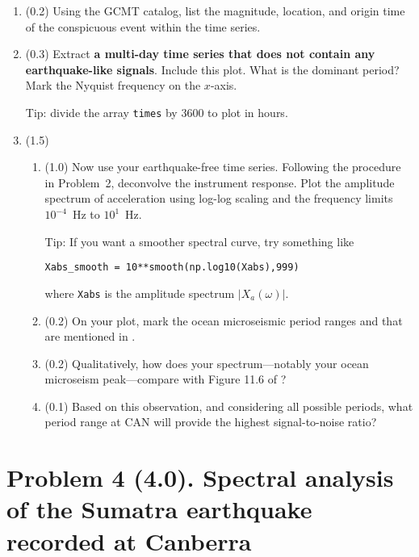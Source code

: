 \documentclass[11pt,titlepage,fleqn]{article}
\begin{document}
\begin{enumerate}
\item (0.2) Using the GCMT catalog, list the magnitude, location, and origin time of the conspicuous event within the time series. 

\item (0.3) Extract {\bf a multi-day time series that does not contain any earthquake-like signals}. Include this plot. What is the dominant period? Mark the Nyquist frequency on the $x$-axis.

Tip: divide the array \verb+times+ by 3600 to plot in hours.

\item (1.5)

\begin{enumerate}
\item (1.0) Now use your earthquake-free time series.
Following the procedure in Problem~2, deconvolve the instrument response.
Plot the amplitude spectrum of acceleration using log-log scaling and the frequency limits $10^{-4}$~Hz to $10^1$~Hz.

Tip: If you want a smoother spectral curve, try something like

\noindent
\verb+Xabs_smooth = 10**smooth(np.log10(Xabs),999)+

\noindent
where \verb+Xabs+ is the amplitude spectrum $|X_a(\omega)|$.

\item (0.2) On your plot, mark the ocean microseismic period ranges  and  that are mentioned in \citet[][Section 11.2]{ShearerE2}.

\item (0.2) Qualitatively, how does your spectrum---notably your ocean microseism peak---compare with Figure 11.6 of \citet{ShearerE2}?

\item (0.1) Based on this observation, and considering all possible periods, what period range at CAN will provide the highest signal-to-noise ratio?

\end{enumerate}

\end{enumerate}


\section*{Problem 4 (4.0). Spectral analysis of the Sumatra earthquake recorded at Canberra}
\end{document}
